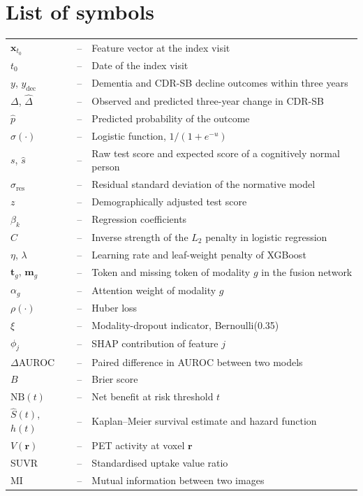 \chapter*{List of symbols}
\begin{center}
\begin{tabular}{@{}lcl@{}}
$\mathbf{x}_{t_0}$ & -- & Feature vector at the index visit \\
$t_0$ & -- & Date of the index visit \\
$y$, $y_{\text{dec}}$ & -- & Dementia and CDR-SB decline outcomes within three years \\
$\Delta$, $\hat{\Delta}$ & -- & Observed and predicted three-year change in CDR-SB \\
$\hat{p}$ & -- & Predicted probability of the outcome \\
$\sigma(\cdot)$ & -- & Logistic function, $1/(1+e^{-u})$ \\
$s$, $\hat{s}$ & -- & Raw test score and expected score of a cognitively normal person \\
$\sigma_{\text{res}}$ & -- & Residual standard deviation of the normative model \\
$z$ & -- & Demographically adjusted test score \\
$\beta_k$ & -- & Regression coefficients \\
$C$ & -- & Inverse strength of the $L_2$ penalty in logistic regression \\
$\eta$, $\lambda$ & -- & Learning rate and leaf-weight penalty of XGBoost \\
$\mathbf{t}_g$, $\mathbf{m}_g$ & -- & Token and missing token of modality $g$ in the fusion network \\
$\alpha_g$ & -- & Attention weight of modality $g$ \\
$\rho(\cdot)$ & -- & Huber loss \\
$\xi$ & -- & Modality-dropout indicator, Bernoulli(0.35) \\
$\phi_j$ & -- & SHAP contribution of feature $j$ \\
$\Delta$AUROC & -- & Paired difference in AUROC between two models \\
$B$ & -- & Brier score \\
$\text{NB}(t)$ & -- & Net benefit at risk threshold $t$ \\
$\hat{S}(t)$, $h(t)$ & -- & Kaplan--Meier survival estimate and hazard function \\
$V(\mathbf{r})$ & -- & PET activity at voxel $\mathbf{r}$ \\
SUVR & -- & Standardised uptake value ratio \\
MI & -- & Mutual information between two images \\
\end{tabular}
\end{center}

